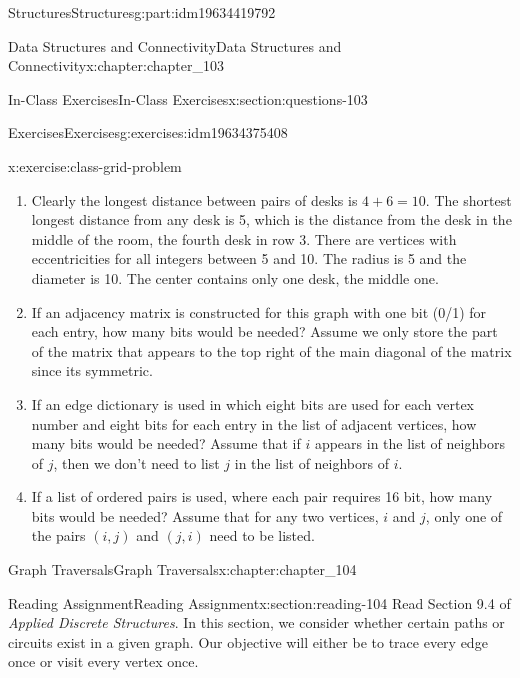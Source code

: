 \documentclass[oneside,10pt,]{book}
\numberwithin{equation}{section}
\begin{document}
\begin{partptx}{Structures}{}{Structures}{}{}{g:part:idm19634419792}
\begin{chapterptx}{Data Structures and Connectivity}{}{Data Structures and Connectivity}{}{}{x:chapter:chapter_103}
\begin{sectionptx}{In-Class Exercises}{}{In-Class Exercises}{}{}{x:section:questions-103}
\begin{exercises-subsection-numberless}{Exercises}{}{Exercises}{}{}{g:exercises:idm19634375408}
\begin{exercisegroup}
\begin{divisionexerciseeg}{3}{}{}{x:exercise:class-grid-problem}
\begin{enumerate}[label=(\alph*)]
\item{}Clearly the longest distance between pairs of desks is \(4+6= 10\). The shortest longest distance from any desk is 5, which is the distance from the desk in the middle of the room, the fourth desk in row 3.  There are vertices with eccentricities for all integers between 5 and 10.  The radius is 5 and the diameter is 10.   The center contains only one desk, the middle one.%
\item{}If an adjacency matrix is constructed for this graph with one bit (0\slash{}1) for each entry, how many bits would be needed?  Assume we only store the part of the matrix that appears to the top right of the main diagonal of the matrix since its symmetric.%
\item{}If an edge dictionary is used in which eight bits are used for each vertex number and eight bits for each entry in the list of adjacent vertices, how many bits would be needed? Assume that if \(i\) appears in the list of neighbors of \(j\), then we don't need to list \(j\) in the list of neighbors of \(i\).%
\item{}If a list of ordered pairs is used, where each pair requires 16 bit, how many bits would be needed?  Assume that for any two vertices, \(i\) and \(j\), only one of the pairs \((i,j)\) and \((j,i)\) need to be listed.%
\end{enumerate}
%
\end{divisionexerciseeg}%
\end{exercisegroup}
\par\medskip\noindent
\end{exercises-subsection-numberless}
\end{sectionptx}
\end{chapterptx}
%
\typeout{************************************************}
\typeout{************************************************}
%
\begin{chapterptx}{Graph Traversals}{}{Graph Traversals}{}{}{x:chapter:chapter_104}
\index{}%
%
%
\typeout{************************************************}
\typeout{************************************************}
%
\begin{sectionptx}{Reading Assignment}{}{Reading Assignment}{}{}{x:section:reading-104}
Read Section 9.4 of \emph{Applied Discrete Structures}.  In this section, we consider whether certain paths or circuits exist in a given graph.  Our objective will either be to trace every edge once or visit every vertex once.%

\end{sectionptx}
\end{chapterptx}
\end{partptx}
\end{document}
